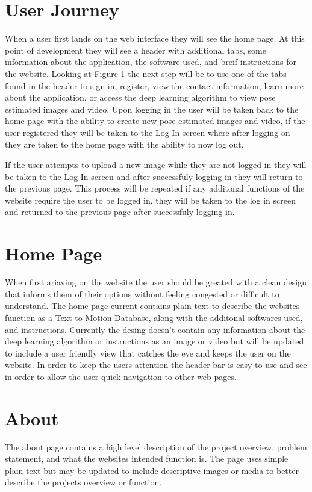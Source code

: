 \documentclass{scrreprt}
\begin{document}
\section{User Journey}
When a user first lands on the web interface they will see the home page. At this point of development they will see a header with additional tabs, some information about the application, the software used, and breif instructions for the website. Looking at Figure 1 the next step will be to use one of the tabs found in the header to sign in, register, view the contact information, learn more about the application, or access the deep learning algorithm to view pose estimated images and video. Upon logging in the user will be taken back to the home page with the ability to create new pose estimated images and video, if the user registered they will be taken to the Log In screen where after logging on they are taken to the home page with the ability to now log out.

If the user attempts to upload a new image while they are not logged in they will be taken to the Log In screen and after successfuly logging in they will return to the previous page. This process will be repeated if any additonal functions of the website require the user to be logged in, they will be taken to the log in screen and returned to the previous page after successfuly logging in.

\section{Home Page}
When first ariaving on the website the user should be greated with a clean design that informs them of their options without feeling congested or difficult to understand. The home page current contains plain text to describe the websites function as a Text to Motion Database, along with the additonal softwares used, and instructions. Currently the desing doesn't contain any information about the deep learning algorithm or instructions as an image or video but will be updated to include a user friendly view that catches the eye and keeps the user on the website. In order to keep the users attention the header bar is easy to use and see in order to allow the user quick navigation to other web pages.

\section{About}
The about page contains a high level description of the project overview, problem statement, and what the websites intended function is. The page uses simple plain text but may be updated to include descriptive images or media to better describe the projects overview or function.
\end{document}
